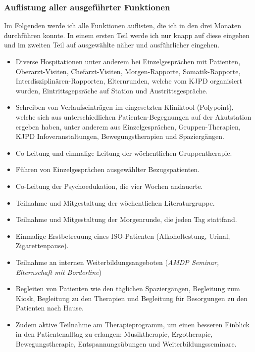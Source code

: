 \documentclass[jou,apacite]{apa6}
\begin{document}
\subsubsection{Auflistung aller ausgeführter Funktionen}
Im Folgenden werde ich alle Funktionen auflisten, die ich in den drei Monaten durchführen konnte. In einem ersten Teil werde ich nur knapp auf diese eingehen und im zweiten Teil auf ausgewählte näher und ausführlicher eingehen.
\begin{itemize}
        \item Diverse Hospitationen unter anderem bei Einzelgesprächen mit Patienten, Oberarzt-Visiten, Chefarzt-Visiten, Morgen-Rapporte, Somatik-Rapporte, Interdisziplinären-Rapporten, Elternrunden, welche vom KJPD organisiert wurden, Eintrittsgepsräche auf Station und Austrittsgespräche.
        \item Schreiben von Verlaufseinträgen im eingesetzten Kliniktool (Polypoint), welche sich aus unterschiedlichen Patienten-Begegnungen auf der Akutstation ergeben haben, unter anderem aus Einzelgesprächen, Gruppen-Therapien, KJPD Infoveranstaltungen, Bewegungstherapien und Spaziergängen.
        \item Co-Leitung und einmalige Leitung der wöchentlichen Gruppentherapie.
        \item Führen von Einzelgesprächen ausgewählter Bezugspatienten.
        \item Co-Leitung der Psychoedukation, die vier Wochen andauerte.
        \item Teilnahme und Mitgestaltung der wöchentlichen Literaturgruppe.
        \item Teilnahme und Mitgestaltung der Morgenrunde, die jeden Tag stattfand.
        \item Einmalige Erstbetreuung eines ISO-Patienten (Alkoholtestung, Urinal, Zigarettenpause).
        \item Teilnahme an internen Weiterbildungsangeboten (\textit{AMDP Seminar, Elternschaft mit Borderline})
        \item Begleiten von Patienten wie den täglichen Spaziergängen, Begleitung zum Kiosk, Begleitung zu den Therapien und Begleitung für Besorgungen zu den Patienten nach Hause.
        \item Zudem aktive Teilnahme am Therapieprogramm, um einen besseren Einblick in den Patientenalltag zu erlangen: Musiktherapie, Ergotherapie, Bewegungstherapie, Entspannungsübungen und Weiterbildungsseminare.
    \end{itemize}
\end{document}
